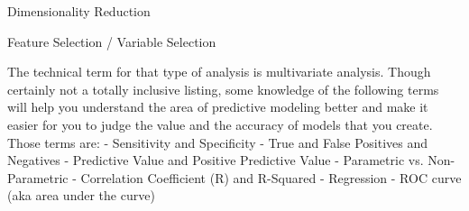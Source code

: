 
Dimensionality Reduction

Feature Selection / Variable Selection




The technical term for that type of analysis is multivariate analysis. Though certainly not a
totally inclusive listing, some knowledge of the following terms will help you understand the area of
predictive modeling better and make it easier for you to judge the value and the accuracy of models that
you create. Those terms are:
- Sensitivity and Specificity
- True and False Positives and Negatives
- Predictive Value and Positive Predictive Value
- Parametric vs. Non-Parametric
- Correlation Coefficient (R) and R-Squared
- Regression
- ROC curve (aka area under the curve)
